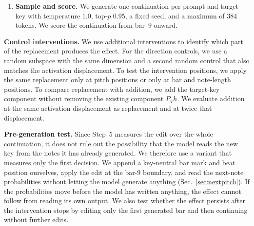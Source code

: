 \documentclass{article}
\begin{document}
\begin{enumerate}
\item \textbf{Sample and score.}
We generate one continuation per prompt and target key with temperature $1.0$, top-$p$ $0.95$, a fixed seed, and a maximum of $384$ tokens.
We score the continuation from bar~$9$ onward.

\end{enumerate}

\noindent\textbf{Control interventions.}
We use additional interventions to identify which part of the replacement produces the effect.
For the direction controls, we use a random subspace with the same dimension and a second random control that also matches the activation displacement.
To test the intervention positions, we apply the same replacement only at pitch positions or only at bar and note-length positions.
To compare replacement with addition, we add the target-key component without removing the existing component $P_Vh$.
We evaluate addition at the same activation displacement as replacement and at twice that displacement.

\noindent\textbf{Pre-generation test.}
Since Step~5 measures the edit over the whole continuation, it does not rule out the possibility that the model reads the new key from the notes it has already generated.
We therefore use a variant that measures only the first decision.
We append a key-neutral bar mark and beat position ourselves, apply the edit at the bar-$9$ boundary, and read the next-note probabilities without letting the model generate anything (Sec.~\ref{sec:nextpitch}).
If the probabilities move before the model has written anything, the effect cannot follow from reading its own output.
We also test whether the effect persists after the intervention stops by editing only the first generated bar and then continuing without further edits.
\end{document}
